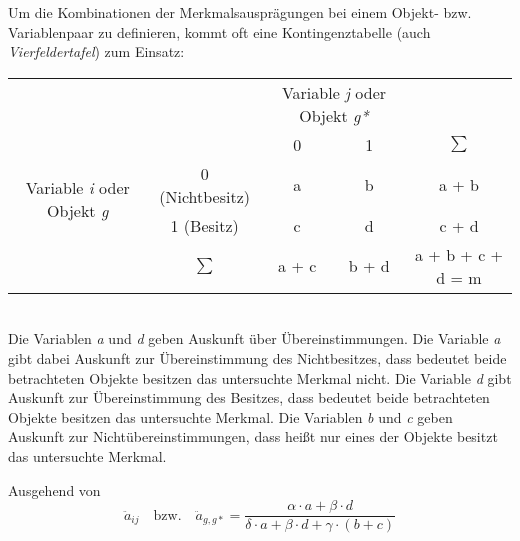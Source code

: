 Um die Kombinationen der Merkmalsausprägungen bei einem Objekt- bzw. Variablenpaar zu definieren, kommt oft eine Kontingenztabelle (auch \textit{Vierfeldertafel}) zum Einsatz: \\

\begin{tabular}{cc|cc|c}
	& & \multicolumn{2}{c|}{Variable \textit{j} oder Objekt \textit{g*}} & \\ 
	& & 0 & 1 & $\sum$ \\ \hline
	\multirow{2}{*}{Variable \textit{i} oder Objekt \textit{g}} & 0 (Nichtbesitz) & a & b & a + b \\
	& 1 (Besitz) & c & d & c + d \\ \hline
	& $\sum$ & a + c & b + d & a + b + c + d = m \\ 
\end{tabular}
\bigskip
\\
Die Variablen \textit{a} und \textit{d} geben Auskunft über Übereinstimmungen. Die Variable \textit{a} gibt dabei Auskunft zur Übereinstimmung des Nichtbesitzes, dass bedeutet beide betrachteten Objekte besitzen das untersuchte Merkmal nicht. Die Variable \textit{d} gibt Auskunft zur Übereinstimmung des Besitzes, dass bedeutet beide betrachteten Objekte besitzen das untersuchte Merkmal. Die Variablen \textit{b} und \textit{c} geben Auskunft zur Nichtübereinstimmungen, dass heißt nur eines der Objekte besitzt das untersuchte Merkmal.

Ausgehend von \citet[S. 199/200]{Bacher.2010}
\begin{equation}
\ddot{a}_{ij} \quad \text{bzw.} \quad \ddot{a}_{g,g*} = \frac{\alpha \cdot a + \beta \cdot d}{\delta \cdot a + \beta \cdot d + \gamma \cdot (b + c)}
\end{equation}

